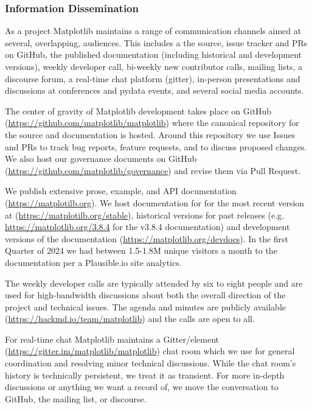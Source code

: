 \documentclass[12pt]{article}
\numberwithin{page}{section}
\begin{document}
\subsubsection{Information Dissemination}

As a project Matplotlib maintains a range of communication channels
aimed at several, overlapping, audiences.  This includes a
the source, issue tracker and PRs on GitHub,
the published documentation (including historical and development versions),
weekly developer call,
bi-weekly new contributor calls,
mailing lists,
a discourse forum,
a real-time chat platform (gitter),
in-person presentations and discussions at conferences and pydata events,
and several social media accounts.


The center of gravity of Matplotlib development takes place on GitHub
(\url{https://github.com/matplotlib/matplotlib}) where the canonical
repository for the source and documentation is hosted.  Around this
repository we use Issues and PRs to track bug reports, feature
requests, and to discuss proposed changes.  We also host our
governance documents on GitHub
(\url{https://github.com/matplotlib/governance}) and revise them via
Pull Request.

We publish extensive prose, example, and API documentation
(\url{https://matplotilb.org}).  We host documentation for for the most recent
version at (\url{https://matplotilb.org/stable}), historical versions for past
releases (e.g. \url{https://matplotlib.org/3.8.4} for the v3.8.4 documentation)
and development versions of the documentation
(\url{https://matplotlib.org/devdocs}).  In the first Quarter of 2024 we had
between 1.5-1.8M unique visitors a month to the documentation per a
Plausible.io site analytics.

The weekly developer calls are typically attended by six to eight people and
are used for high-bandwidth discussions about both the overall direction of the
project and technical issues.  The agenda and minutes are publicly available
(\url{https://hackmd.io/team/matplotlib}) and the calls are open to all.

For real-time chat Matplotlib maintains a Gitter/element
(\url{https://gitter.im/matplotlib/matplotlib}) chat room which we use for
general coordination and resolving minor technical discussions.  While the chat
room's history is technically persistent, we treat it as transient.  For more
in-depth discussions or anything we want a record of, we move the conversation
to GitHub, the mailing list, or discourse.
\end{document}
